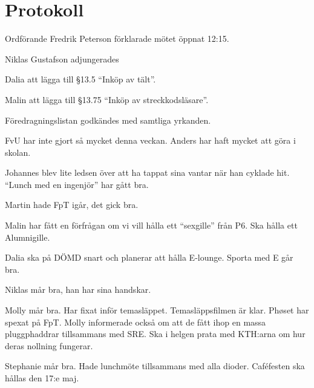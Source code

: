\documentclass[10pt]{article}
\def\mo{Fredrik Peterson}
\begin{document}
\section*{Protokoll}
\begin{paragrafer}
Ordförande {\mo} förklarade mötet öppnat 12:15.

\valavmo

\valavms

\tosg

Niklas Gustafson adjungerades

\valavj

Dalia \ypa att lägga till \S13.5 ``Inköp av tält''.

Malin \ypa att lägga till \S13.75 ``Inköp av streckkodsläsare''.

Föredragningslistan godkändes med samtliga yrkanden.


\begin{fyllnadsval} %
\end{fyllnadsval}

\begin{paragrafer}
FvU har inte gjort så mycket denna veckan. Anders har haft mycket att göra i skolan.

Johannes blev lite ledsen över att ha tappat sina vantar när han cyklade hit. ``Lunch med en ingenjör'' har gått bra.

Martin hade FpT igår, det gick bra.

Malin har fått en förfrågan om vi vill hålla ett ``sexgille'' från P6. Ska hålla ett Alumnigille.

Dalia ska på DÖMD snart och planerar att hålla E-lounge. Sporta med E går bra.

Niklas mår bra, han har sina handskar.

Molly mår bra. Har fixat inför temasläppet. Temasläppsfilmen är klar. Phøset har spexat på FpT. Molly informerade också om att de fått ihop en massa pluggphaddrar tillsammans med SRE. Ska i helgen prata med KTH:arna om hur deras nollning fungerar.

Stephanie mår bra. Hade lunchmöte tillsammans med alla dioder. Caféfesten ska hållas den 17:e maj.


\end{paragrafer}
\end{paragrafer}
\end{document}
